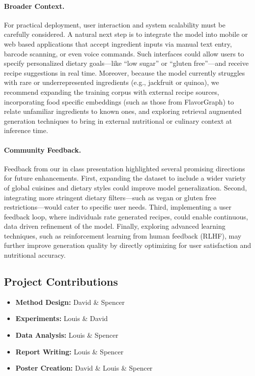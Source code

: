 \paragraph{Broader Context.}
For practical deployment, user interaction and system scalability must be carefully considered. A natural next step is to integrate the model into mobile or web based applications that accept ingredient inputs via manual text entry, barcode scanning, or even voice commands. Such interfaces could allow users to specify personalized dietary goals—like “low sugar” or “gluten free”—and receive recipe suggestions in real time. Moreover, because the model currently struggles with rare or underrepresented ingredients (e.g., jackfruit or quinoa), we recommend expanding the training corpus with external recipe sources, incorporating food specific embeddings (such as those from FlavorGraph) to relate unfamiliar ingredients to known ones, and exploring retrieval augmented generation techniques to bring in external nutritional or culinary context at inference time.

\paragraph{Community Feedback.}
Feedback from our in class presentation highlighted several promising directions for future enhancements. First, expanding the dataset to include a wider variety of global cuisines and dietary styles could improve model generalization. Second, integrating more stringent dietary filters—such as vegan or gluten free restrictions—would cater to specific user needs. Third, implementing a user feedback loop, where individuals rate generated recipes, could enable continuous, data driven refinement of the model. Finally, exploring advanced learning techniques, such as reinforcement learning from human feedback (RLHF), may further improve generation quality by directly optimizing for user satisfaction and nutritional accuracy.


\subsection{Project Contributions}

\begin{itemize}
	\item \textbf{Method Design:} David \& Spencer
	\item \textbf{Experiments:} Louis \& David
	\item \textbf{Data Analysis:} Louis \& Spencer
	\item \textbf{Report Writing:} Louis \& Spencer
	\item \textbf{Poster Creation:} David \& Louis \& Spencer
\end{itemize}
